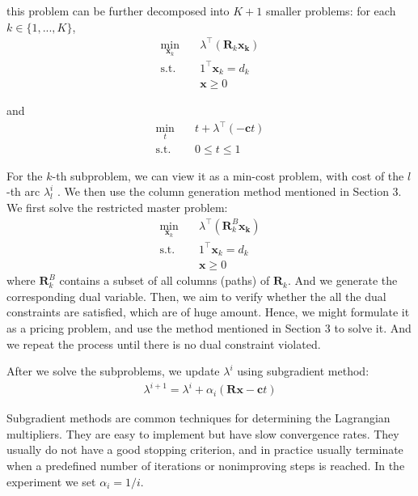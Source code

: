 this problem can be further decomposed into $K+1$ smaller problems: for each $k\in \{1,...,K\}$,
\begin{subequations}
\begin{align}
\min _{\mathbf{x}_k} \quad & \lambda^{\top}\left(\mathbf{R}_k\mathbf{x_k}\right)\\
\text {s.t.} \quad
& 1^\top \mathbf{x}_{k}=d_{k}  \\
& \mathbf{x} \geq 0 
\end{align}
\end{subequations}

and
\begin{subequations}
\begin{align}
\min _{t} \quad & t+\lambda^{\top}\left( - \mathbf{c}t\right)\\
\text {s.t.} \quad
& 0\leq t \leq 1
\end{align}
\end{subequations}

For the $k$-th subproblem, we can view it as a min-cost problem, with cost of the $l$-th arc $\lambda^{i}_{l}$ . We then use the column generation method mentioned in Section 3. We first solve the restricted master problem:
\begin{subequations}
\begin{align}
\min _{\mathbf{x}_k} \quad & \lambda^{\top}\left(\mathbf{R}_k^{B}\mathbf{x_k}\right)\\
\text {s.t.} \quad
& 1^\top \mathbf{x}_{k}=d_{k}  \\
& \mathbf{x} \geq 0 
\end{align}
\end{subequations}
where $\mathbf{R}_k^{B}$ contains a subset of all columns (paths) of $\mathbf{R}_k$. And we generate the corresponding dual variable.  Then, we aim to verify whether the all the dual constraints are satisfied, which are of huge amount. Hence, we might formulate it as a pricing problem, and use the method mentioned in Section 3 to solve it. And we repeat the process until there is no dual constraint violated. 

After we solve the subproblems, we update $\lambda^{i}$ using subgradient method:
\begin{align}
    \lambda^{i+1}=\lambda^{i}+\alpha_i\left(\mathbf{R} \mathbf{x} - \mathbf{c} t\right)
\end{align}


Subgradient methods are common techniques for determining the Lagrangian multipliers. They are easy to implement
but have slow convergence rates. They usually do not have a good stopping criterion, and in practice usually
terminate when a predefined number of iterations or nonimproving steps is reached.
In the experiment we set $\alpha_i=1/i$.
